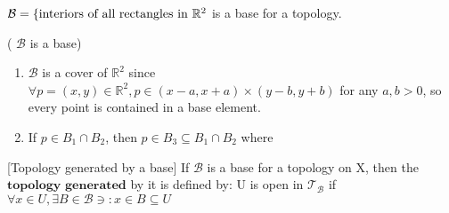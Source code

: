 \documentclass[11pt]{amsart}
\begin{document}
\begin{example}
$\mathcal{B}  = \{\textnormal{interiors of all rectangles in } \mathbb{R}^2$ is a base for a topology.
\begin{verify} { (  $\mathcal{B}$ is a base)       }
\begin{enumerate}
\item $\mathcal{B}$  is a cover of $\mathbb{R}^2$ since $\forall p=(x,y) \in \mathbb{R}^2, p \in (x-a,x+a) \times (y-b,y+b)$  for any $a,b > 0$, so every point is contained in a base element.
\item If $p \in B_1 \cap  B_2$, then $p \in B_3 \subseteq B_1 \cap B_2$ where
\end{enumerate}
\end{verify}
\end{example}




\begin{definition}{[Topology generated by a base]}
If $\mathcal{B}$ is a base for a topology on X, then the $\textbf{topology generated}$ by it is defined by:
U is open in $\mathcal{T}_{\mathcal{B}}$ if $\forall x \in U, \exists B \in \mathcal{B} \ni: x \in B \subseteq U$
\end{definition}
\end{document}
